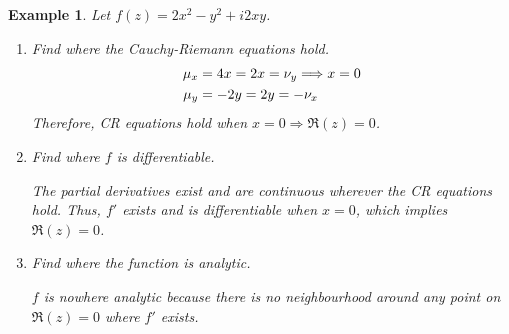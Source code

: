 \documentclass{article}
\newtheorem{example}[theorem]{Example}
\theoremstyle{definition}
\begin{document}
\begin{example} \normalfont
    Let $f(z) = 2x^2 - y^2 + i 2xy$.
    \begin{enumerate}
        \item[(i)] Find where the Cauchy-Riemann equations hold.
        \begin{align*}
            \mu_x &= 4x = 2x = \nu_y \Longrightarrow x = 0 \\
            \mu_y &= -2y = \-2y = -\nu_x
        \end{align*}
        Therefore, CR equations hold when $x=0 \Longrightarrow \Re(z) = 0$.
        \item[(ii)] Find where $f$ is differentiable.
 
        The partial derivatives exist and are continuous wherever the CR equations hold. Thus, $f'$ exists and is differentiable when $x = 0$, which implies $\Re(z) = 0$.
        \item[(iii)] Find where the function is analytic.

        $f$ is nowhere analytic because there is no neighbourhood around any point on $\Re(z) = 0$ where $f'$ exists.
    \end{enumerate}
\end{example}
\end{document}
